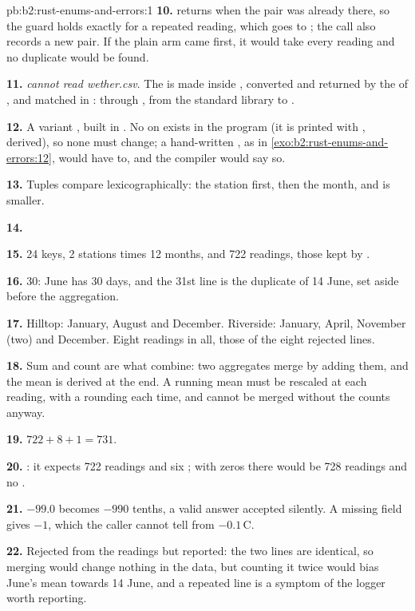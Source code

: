 \begin{solution}{pb:b2:rust-enums-and-errors:1}
\textbf{10.}  returns  when the pair was already there, so the guard holds exactly for
a repeated reading, which goes to ; the call also records a new pair. If the plain  arm
came first, it would take every reading and no duplicate would be found.

\textbf{11.} \emph{cannot read wether.csv}. The  is made inside , converted and
returned by the  of , and matched in : through , from the standard
library to .

\textbf{12.} A variant , built in . No  on  exists
in the program (it is printed with , derived), so none must change; a hand-written , as in
\cref{exo:b2:rust-enums-and-errors:12}, would have to, and the compiler would say so.

\textbf{13.} Tuples compare lexicographically: the station first, then the month, and  is smaller.

\textbf{14.} 

\textbf{15.} 24 keys, 2 stations times 12 months, and 722 readings, those kept by .

\textbf{16.} 30: June has 30 days, and the 31st line is the duplicate of 14 June, set aside before the aggregation.

\textbf{17.} Hilltop: January, August and December. Riverside: January, April, November (two) and December. Eight
readings in all, those of the eight rejected lines.

\textbf{18.} Sum and count are what combine: two aggregates merge by adding them, and the mean is derived at the
end. A running mean must be rescaled at each reading, with a rounding each time, and cannot be merged without the
counts anyway.

\textbf{19.} $722 + 8 + 1 = 731$.

\textbf{20.} : it expects 722 readings and six ; with zeros there would be
728 readings and no .

\textbf{21.} $-99.0$ becomes $-990$ tenths, a valid answer accepted silently. A missing field gives $-1$, which the
caller cannot tell from $-0.1$\,\textdegree C.

\textbf{22.} Rejected from the readings but reported: the two lines are identical, so merging would change nothing in
the data, but counting it twice would bias June's mean towards 14 June, and a repeated line is a symptom of the
logger worth reporting.


\end{solution}
